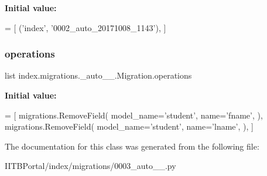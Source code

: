{\bfseries Initial value\+:}
\begin{DoxyCode}
=  [
        (\textcolor{stringliteral}{'index'}, \textcolor{stringliteral}{'0002\_auto\_20171008\_1143'}),
    ]
\end{DoxyCode}
\mbox{\label{classindex_1_1migrations_1_10003__auto__20171010__1850_1_1Migration_a6fa3d766892a91a28b58fda41c361cdd}} 
\subsubsection{\texorpdfstring{operations}{operations}}
{\footnotesize\ttfamily list index.\+migrations.\+\_\+auto\+\_\+\_.\+Migration.\+operations\hspace{0.3cm}{\ttfamily [static]}}

{\bfseries Initial value\+:}
\begin{DoxyCode}
=  [
        migrations.RemoveField(
            model\_name=\textcolor{stringliteral}{'student'},
            name=\textcolor{stringliteral}{'fname'},
        ),
        migrations.RemoveField(
            model\_name=\textcolor{stringliteral}{'student'},
            name=\textcolor{stringliteral}{'lname'},
        ),
    ]
\end{DoxyCode}


The documentation for this class was generated from the following file\+:\begin{DoxyCompactItemize}
\item 
I\+I\+T\+B\+Portal/index/migrations/0003\+\_\+auto\+\_\+\_.\+py\end{DoxyCompactItemize}
